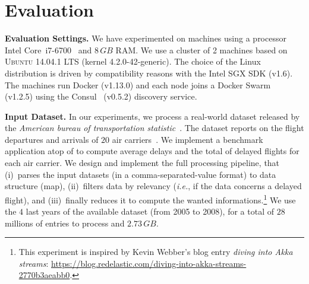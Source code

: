 \section{Evaluation}\label{sec:eval}

\noindent\textbf{Evaluation Settings.}
We have experimented on machines using a processor Intel Core\texttrademark~i7-6700~\cite{intel:i7_6700} and $8\,GB$ RAM.
We use a cluster of 2 machines based on \textsc{Ubuntu} 14.04.1 LTS (kernel 4.2.0-42-generic).
The choice of the Linux distribution is driven by compatibility reasons with the Intel SGX SDK (v1.6).
The machines run Docker (v1.13.0) and each node joins a Docker Swarm~\cite{docker:swarm_2016} (v1.2.5) using the Consul~\cite{consul} (v0.5.2) discovery service.

\noindent\textbf{Input Dataset.}
In our experiments, we process a real-world dataset released by the \emph{American bureau of transportation statistic}~\cite{rita:bts}.
The dataset reports on the flight departures and arrivals of $20$ air carriers~\cite{statistical_computing:data}.
We implement a benchmark application atop of \SYS{} to compute average delays and the total of delayed flights for each air carrier.%
We design and implement the full processing pipeline, that (i)~parses the input datasets (in a comma-separated-value format) to data structure (\textsf{map}), (ii)~filters data by relevancy (\emph{i.e.}, if the data concerns a delayed flight), and (iii)~finally reduces it to compute the wanted informations.\footnote{This experiment is inspired by Kevin Webber's blog entry \emph{diving into Akka streams}: \url{https://blog.redelastic.com/diving-into-akka-streams-2770b3aeabb0}.}
We use the $4$ last years of the available dataset (from 2005 to 2008), for a total of $28$ millions of entries to process and $2.73\,GB$.


